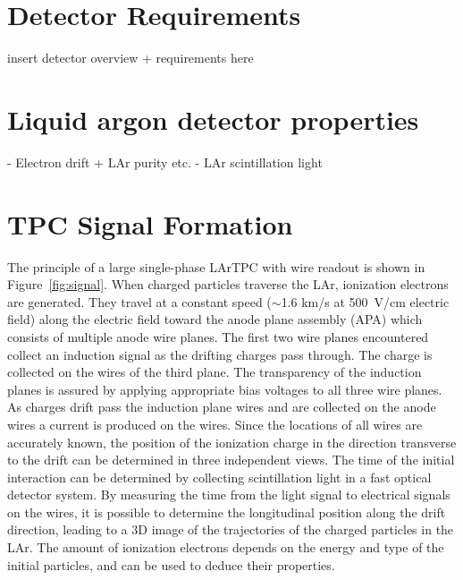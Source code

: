 
\section{Detector Requirements}\label{sec:detector_requirements}

insert detector overview + requirements here 

\section{Liquid argon detector properties}
- Electron drift + LAr purity etc.
- LAr scintillation light 

\section{TPC Signal Formation}\label{sec:tpc_signal_formation}


The principle of a large single-phase LArTPC with wire readout is shown in 
Figure~\ref{fig:signal}. When charged particles traverse the LAr,
ionization electrons are generated. They %
travel at a constant speed 
($\sim$1.6 km/s at 500~V/cm electric field) along the electric field 
toward the anode plane assembly (APA) which consists of multiple anode wire planes. 
The first two wire planes encountered collect 
an induction signal as the drifting charges pass through.  The charge is collected 
on the wires of the third plane. The transparency of the induction planes is assured by 
applying appropriate bias voltages to all three wire planes. As charges drift pass the induction 
plane wires and are collected on the anode wires
a current is produced on the wires. Since the locations of all wires are 
accurately known, the position of the ionization charge in the direction 
transverse to the drift can be determined in three independent views. The time 
of the initial interaction can be determined by collecting scintillation light 
in a fast optical detector system. By measuring the time from the light signal 
to electrical signals on the wires, it is possible to determine the longitudinal position 
along the drift direction, leading to %
a 3D image of the trajectories 
of the charged particles in the LAr. The amount of ionization electrons depends on 
the energy and type of the initial particles, and can be used to deduce their properties.

